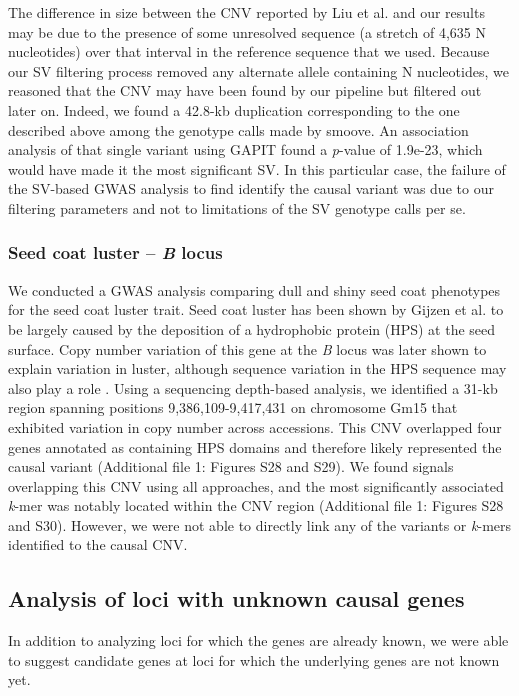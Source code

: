 \documentclass[doublespacing]{bmcart}
\begin{document}
The difference in size between the CNV reported by Liu et al. \cite{liu2020ps} and our
results may be due to the presence of some unresolved sequence (a stretch of
4,635 N nucleotides) over that interval in the reference sequence that we used.
Because our SV filtering process removed any alternate allele containing N nucleotides,
we reasoned that the CNV may have been found by our pipeline but
filtered out later on. Indeed, we found a 42.8-kb duplication corresponding
to the one described above among the genotype calls made by smoove. An association
analysis of that single variant using GAPIT found a \textit{p}-value of 1.9e-23,
which would have made it the most significant SV. In this particular case, the
failure of the SV-based GWAS analysis to find identify the causal variant was due
to our filtering parameters and not to limitations of the SV genotype calls per se.

\subsubsection*{Seed coat luster -- \textit{B} locus}

We conducted a GWAS analysis comparing dull and shiny seed coat phenotypes for
the seed coat luster trait. Seed coat luster has been shown by
Gijzen et al. \cite{gijzen1999} to be largely caused by the deposition of a hydrophobic
protein (HPS) at the seed surface. Copy number variation of this gene at the
\textit{B} locus was later shown to explain variation in luster, although
sequence variation in the HPS sequence may also play a role \citep{gijzen2006}.
Using a sequencing depth-based analysis, we identified a 31-kb region spanning
positions 9,386,109-9,417,431 on chromosome Gm15 that exhibited variation in
copy number across accessions. This CNV overlapped four genes annotated as
containing HPS domains and therefore likely represented the causal variant
(Additional file 1: Figures S28 and
S29).  We found signals overlapping this
CNV using all approaches, and the most significantly associated \textit{k}-mer
was notably located within the CNV region (Additional file 1: Figures
S28 and
S30). However, we were not able to
directly link any of the variants or \textit{k}-mers identified to the causal
CNV.

\subsection*{Analysis of loci with unknown causal genes}

In addition to analyzing loci for which the genes are already known, we were
able to suggest candidate genes at loci for which the underlying genes are not
known yet. 
\end{document}
